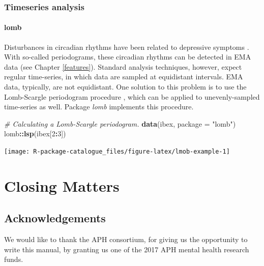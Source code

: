 \documentclass[]{book}
\newenvironment{Shaded}{\begin{snugshade}}{\end{snugshade}}
\newcommand{\KeywordTok}[1]{\textcolor[rgb]{0.13,0.29,0.53}{\textbf{#1}}}
\newcommand{\DataTypeTok}[1]{\textcolor[rgb]{0.13,0.29,0.53}{#1}}
\newcommand{\DecValTok}[1]{\textcolor[rgb]{0.00,0.00,0.81}{#1}}
\newcommand{\StringTok}[1]{\textcolor[rgb]{0.31,0.60,0.02}{#1}}
\newcommand{\CommentTok}[1]{\textcolor[rgb]{0.56,0.35,0.01}{\textit{#1}}}
\newcommand{\OperatorTok}[1]{\textcolor[rgb]{0.81,0.36,0.00}{\textbf{#1}}}
\newcommand{\NormalTok}[1]{#1}
\begin{document}
\section{Timeseries analysis}\label{timeseries-analysis}

\subsection{lomb}\label{lomb}

 

Disturbances in circadian rhythms have been related to depressive
symptoms \citep[see, e.g.,][]{Saeb2015}. With so-called periodograms,
these circadian rhythms can be detected in EMA data (see Chapter
\ref{features}). Standard analysis techniques, however, expect regular
time-series, in which data are sampled at equidistant intervals. EMA
data, typically, are not equidistant. One solution to this problem is to
use the Lomb-Scargle periodogram procedure \citep{Lomb1976}, which can
be applied to unevenly-sampled time-series as well. Package \emph{lomb}
\citep{ruf1999} implements this procedure.

\begin{Shaded}
\begin{Highlighting}[]
\CommentTok{# Calculating a Lomb-Scargle periodogram.}
\KeywordTok{data}\NormalTok{(ibex, }\DataTypeTok{package =} \StringTok{"lomb"}\NormalTok{) }
\NormalTok{lomb}\OperatorTok{::}\KeywordTok{lsp}\NormalTok{(ibex[}\DecValTok{2}\OperatorTok{:}\DecValTok{3}\NormalTok{]) }
\end{Highlighting}
\end{Shaded}

\begin{center}\texttt{[image: R-package-catalogue\_files/figure-latex/lmob-example-1]} \end{center}

\part{Closing Matters}\label{part-closing-matters}

\chapter*{Acknowledgements}\label{acknowledgements}

We would like to thank the APH consortium, for giving us the opportunity
to write this manual, by granting us one of the 2017 APH mental health
research funds.
\end{document}
